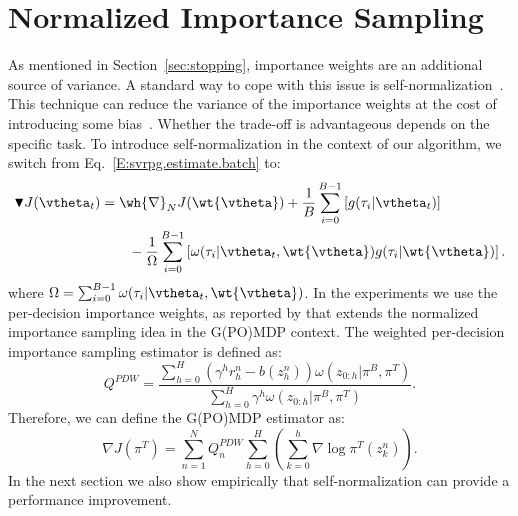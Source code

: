 \section{Normalized Importance Sampling}\label{sec:prac}
\vspace{-0.05in}
As mentioned in Section~\ref{sec:stopping}, importance weights are an additional source of variance. A standard way to cope with this issue is self-normalization~\citep[\eg][]{precup2000eligibility,owenmcbook}.
This technique can reduce the variance of the importance weights at the cost of introducing some bias~\citep[][Chapter 9]{owenmcbook}.
Whether the trade-off is advantageous depends on the specific task.  
To introduce self-normalization in the context of our algorithm, we switch from Eq.~\eqref{E:svrpg.estimate.batch} to:
\begin{align*}
\blacktriangledown J(\vtheta_{t}) &= \wh{\nabla}_N J(\wt{\vtheta}) + \frac{1}{B} \sum_{i=0}^{B-1} \left[g(\tau_i|\vtheta_t)\right]\\ 
&\qquad{} - \frac{1}{\Omega} \sum_{i=0}^{B-1} \left[ \omega(\tau_i|\vtheta_t, \wt{\vtheta}) g(\tau_i|\wt{\vtheta})
\right].
\end{align*}
where $\Omega = \sum_{i=0}^{B-1}\omega(\tau_i|\vtheta_t, \wt{\vtheta})$.
\newline
In the experiments we use the per-decision importance weights, as reported by \cite[\eg][]{precup2000eligibility} that extends the normalized importance sampling idea in the G(PO)MDP context. 
The weighted per-decision importance sampling estimator is defined as:
\[
Q^{PDW} = \frac{\sum_{h=0}^H  \left(\gamma^h r_h^n - b(z_h^n)\right) \omega(z_{0:h}|\pi^B,\pi^T)}{\sum_{h=0}^H \gamma^h \omega(z_{0:h}|\pi^B,\pi^T)}.
\]
Therefore, we can define the G(PO)MDP estimator as:
\[
\nabla J(\pi^T) = \sum_{n=1}^{N} Q^{PDW}_n
	\sum_{h=0}^H \left(\sum_{k=0}^h \nabla \log\pi^T(z_k^n)\right) .
\]
\newline
In the next section we also show empirically that self-normalization can provide a performance improvement.


\vspace{-0.05in}

